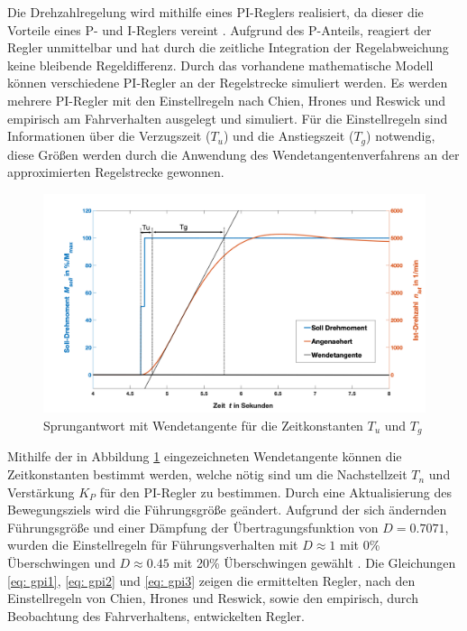		Die Drehzahlregelung wird mithilfe eines PI-Reglers realisiert, da dieser die Vorteile eines P- und I-Reglers vereint \cite{praktischeregelungstechnik}. Aufgrund des P-Anteils, reagiert der Regler unmittelbar und hat durch die zeitliche Integration der Regelabweichung keine bleibende Regeldifferenz. Durch das vorhandene mathematische Modell können verschiedene PI-Regler an der Regelstrecke simuliert werden. Es werden mehrere PI-Regler mit den Einstellregeln nach Chien, Hrones und Reswick und empirisch am Fahrverhalten ausgelegt und simuliert. Für die Einstellregeln sind Informationen über die Verzugszeit ($T_{u}$) und die Anstiegszeit ($T_{g}$) notwendig, diese Größen werden durch die Anwendung des  Wendetangentenverfahrens an der approximierten Regelstrecke gewonnen. \cite{unbehauen,praktischeregelungstechnik}
		
			\begin{figure}[H]
			\centering
			\includegraphics[width=1.0\textwidth]{Bilder/sprungantwort_wende.png}
			\caption{Sprungantwort mit Wendetangente für die Zeitkonstanten $T_{u}$ und $T_{g}$}
			\label{fig: sprungantwort_wende}
			\end{figure} 
		
		
			Mithilfe der in Abbildung \ref{fig: sprungantwort_wende} eingezeichneten Wendetangente können die Zeitkonstanten bestimmt werden, welche nötig sind um die Nachstellzeit $T_n$ und Verstärkung $K_P$ für den PI-Regler zu bestimmen. Durch eine Aktualisierung des Bewegungsziels wird die Führungsgröße geändert. Aufgrund der sich ändernden Führungsgröße und einer Dämpfung der Übertragungsfunktion von $D=0.7071$, wurden die Einstellregeln für Führungsverhalten mit $D \approx 1 $ mit 0\% Überschwingen und $D \approx 0.45 $  mit 20\% Überschwingen gewählt \cite{praktischeregelungstechnik}. Die Gleichungen \ref{eq: gpi1}, \ref{eq: gpi2} und \ref{eq: gpi3} zeigen die ermittelten Regler, nach den Einstellregeln von Chien, Hrones und Reswick, sowie den empirisch, durch Beobachtung des Fahrverhaltens, entwickelten Regler.
		
